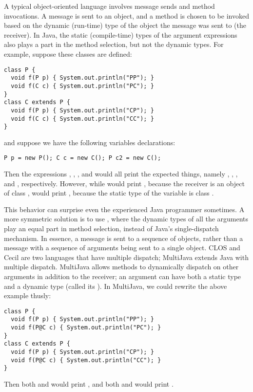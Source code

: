 \documentclass[12pt]{article}
\begin{document}

A typical object-oriented language involves message sends and method
invocations.  A message is sent to an object, and a method is chosen
to be invoked based on the dynamic (run-time) type of the object the
message was sent to (the receiver).  In Java, the static
(compile-time) types of the argument expressions also plays a part in
the method selection, but not the dynamic types.  For example, suppose
these classes are defined:
\begin{verbatim}
class P {
  void f(P p) { System.out.println("PP"); }
  void f(C c) { System.out.println("PC"); }
}
class C extends P {
  void f(P p) { System.out.println("CP"); }
  void f(C c) { System.out.println("CC"); }
}
\end{verbatim}
and suppose we have the following variables declarations:
\begin{verbatim}
P p = new P(); C c = new C(); P c2 = new C();
\end{verbatim}
Then the expressions , , ,
and  would all print the expected things, namely
, , , and , respectively.
However, while  would print , because the
receiver  is an object of class , 
would print , because the static type of the 
variable is class .

This behavior can surprise even the experienced Java programmer
sometimes.  A more symmetric solution is to use
, where the dynamic types of all the arguments 
play an equal part in method selection, instead of Java's
single-dispatch mechanism.  In essence, a message is sent to a
sequence of objects, rather than a message with a sequence of
arguments being sent to a single object.  CLOS \cite{CLtL} and Cecil
\cite{Cecil} are two languages that have multiple dispatch; MultiJava
\cite{MultiJava} extends Java with multiple dispatch.  MultiJava
allows methods to dynamically dispatch on other arguments in addition
to the receiver; an argument can have both a static type and a dynamic
type (called its ).  In MultiJava, we could rewrite
the above example thusly:
\begin{verbatim}
class P {
  void f(P p) { System.out.println("PP"); }
  void f(P@C c) { System.out.println("PC"); }
}
class C extends P {
  void f(P p) { System.out.println("CP"); }
  void f(P@C c) { System.out.println("CC"); }
}
\end{verbatim}
Then both  and  would print , and
both  and  would print .
\end{document}
